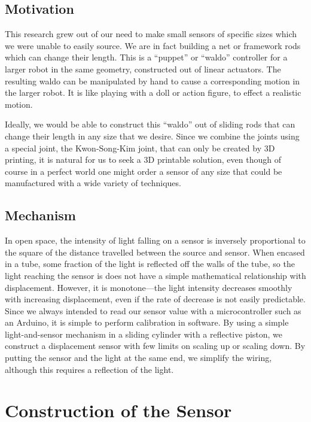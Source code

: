 \documentclass[10pt,conference,compsocconf]{IEEEtran}
\begin{document}
\subsection{Motivation}

This research grew out of our need to make small sensors of specific sizes which we were unable to easily source.  We are in fact building a net or framework rods which can change their length. This is a “puppet” or “waldo” controller for a larger robot in the same geometry, constructed out of linear actuators. The resulting waldo can be manipulated by hand to cause a corresponding motion in the larger robot. It is like playing with a doll or action figure, to effect a realistic motion.

Ideally, we would be able to construct this “waldo” out of sliding rods that can change their length in any size that we desire. Since we combine the joints using a special joint, the Kwon-Song-Kim joint, that can only be created by 3D printing, it is natural for us to seek a 3D printable solution, even though of course in a perfect world one might order a sensor of any size that could be manufactured with a wide variety of techniques.


\subsection{Mechanism}

In open space, the intensity of light falling on a sensor is inversely proportional to the square of the distance travelled between the source and sensor. When encased in a tube, some fraction of the light is reflected off the walls of the tube, so the light reaching the sensor is does not have a simple mathematical relationship with displacement. However, it is monotone---the light intensity decreases smoothly with increasing displacement, even if the rate of decrease is not easily predictable. Since we always intended to read our sensor value with a microcontroller such as an Arduino, it is simple to perform calibration in software. By using a simple light-and-sensor mechanism in a sliding cylinder with a reflective piston, we construct a displacement sensor with few limits on scaling up or scaling down. By putting the sensor and the light at the same end, we simplify the wiring, although this requires a reflection of the light.


\section{Construction of the Sensor}
\end{document}
